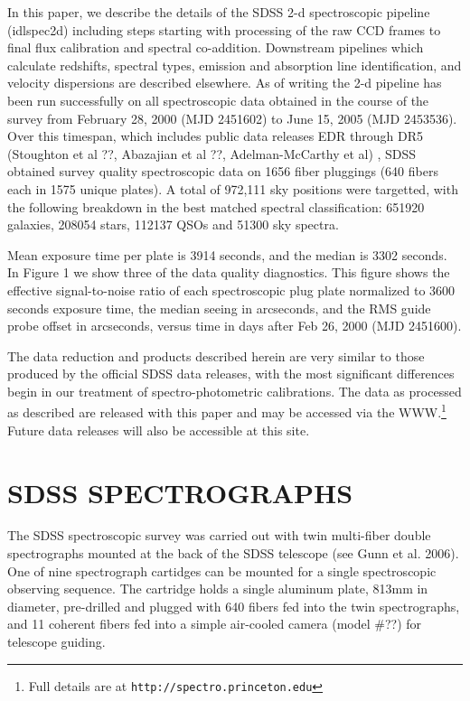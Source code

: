 \documentclass[12pt,preprint]{aastex}
\begin{document}
In this paper, we describe the details of the SDSS 2-d spectroscopic pipeline
(idlspec2d) including steps starting with processing of the raw CCD frames to final
flux calibration and spectral co-addition.  Downstream pipelines which
calculate redshifts, spectral types, emission and absorption line identification,
and velocity dispersions are described elsewhere.
As of writing the 2-d pipeline has been run successfully on all spectroscopic
data obtained in the course of the survey from February 28, 2000 (MJD 2451602) 
to June 15, 2005 (MJD 2453536).  Over this timespan, which includes public data 
releases EDR through DR5 (Stoughton et al ??, Abazajian et al ??, 
Adelman-McCarthy et al)
, SDSS obtained survey quality spectroscopic data on
1656 fiber pluggings (640 fibers each in 1575 unique plates).   
A total of 972,111 sky positions were targetted, with the following 
breakdown in the best matched spectral classification:  651920 galaxies, 
208054 stars, 112137 QSOs and 51300 sky spectra.

Mean exposure time per plate is 3914 seconds, and the median is 3302 seconds.
In Figure 1 we show three of the data quality diagnostics. This figure shows
the effective signal-to-noise ratio of each spectroscopic plug plate 
normalized to 3600 seconds exposure time, the median seeing in arcseconds,
and the RMS guide probe offset
in arcseconds, versus time in days after Feb 26, 2000 (MJD 2451600).

The data reduction and products described herein are very similar to
those produced by the official SDSS data releases, 
with the most significant differences begin in our treatment of 
spectro-photometric calibrations.  The data as processed as described
are released
with this paper and may be accessed via the WWW.\footnote{Full details
are at \texttt{http://spectro.princeton.edu}}
Future data releases will also be accessible at this site. 

\section{SDSS SPECTROGRAPHS}
\label{sec_spectrographs}

The SDSS spectroscopic survey was carried out with twin multi-fiber 
double spectrographs mounted at the back of the SDSS telescope 
(see Gunn et al.  2006).  
One of nine spectrograph cartidges can be mounted for a single
spectroscopic observing sequence.  The cartridge holds a single aluminum
plate, 813mm in diameter, pre-drilled and plugged with 640 fibers 
fed into the twin spectrographs, 
and 11 coherent fibers fed into a simple air-cooled camera (model \#??)
for telescope guiding.
\end{document}
